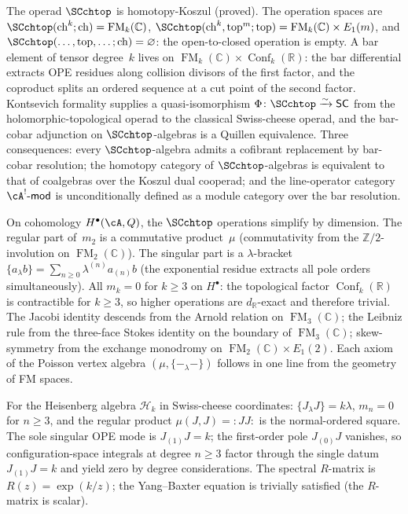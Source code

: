 The operad $\SCchtop$ is homotopy-Koszul (proved). The operation spaces
are $\SCchtop(\mathrm{ch}^k;\mathrm{ch})=\operatorname{FM}_k(\mathbb C)$,
$\SCchtop(\mathrm{ch}^k,\mathrm{top}^m;\mathrm{top})
=\operatorname{FM}_k(\mathbb C)\times E_1(m)$, and
$\SCchtop(\ldots,\mathrm{top},\ldots;\mathrm{ch})=\varnothing$:
the open-to-closed operation is empty. A bar element of tensor degree~$k$ lives on
$\operatorname{FM}_k(\mathbb C)\times\operatorname{Conf}_k(\mathbb R)$:
the bar differential extracts OPE residues along collision divisors of the
first factor, and the coproduct splits an ordered sequence at a cut point
of the second factor. Kontsevich formality supplies a
quasi-isomorphism $\Phi\colon\SCchtop\xrightarrow{\sim}\mathsf{SC}$ from
the holomorphic-topological operad to the classical Swiss-cheese operad,
and the bar-cobar adjunction on $\SCchtop$-algebras is a Quillen
equivalence. Three consequences: every $\SCchtop$-algebra admits a
cofibrant replacement by bar-cobar resolution; the homotopy category of
$\SCchtop$-algebras is equivalent to that of coalgebras over the Koszul
dual cooperad; and the line-operator category
$\cA^!\text{-}\mathsf{mod}$ is unconditionally defined as a module
category over the bar resolution.

On cohomology $H^\bullet(\cA,Q)$, the $\SCchtop$ operations simplify by
dimension. The regular part of~$m_2$ is a commutative product~$\mu$
(commutativity from the $\mathbb Z/2$-involution on
$\operatorname{FM}_2(\mathbb C)$). The singular part is a
$\lambda$-bracket $\{a_\lambda b\}=\sum_{n\ge 0}\lambda^{(n)}a_{(n)}b$
(the exponential residue extracts all pole orders simultaneously). All
$m_k=0$ for $k\ge 3$ on $H^\bullet$: the topological factor
$\operatorname{Conf}_k(\mathbb R)$ is contractible for $k\ge 3$, so
higher operations are $d_{\mathbb R}$-exact and therefore trivial. The
Jacobi identity descends from the Arnold relation on
$\operatorname{FM}_3(\mathbb C)$; the Leibniz rule from the three-face
Stokes identity on the boundary of
$\operatorname{FM}_3(\mathbb C)$; skew-symmetry from
the exchange monodromy on $\operatorname{FM}_2(\mathbb C)\times E_1(2)$.
Each axiom of the Poisson vertex algebra $(\mu,\{-_\lambda-\})$ follows
in one line from the geometry of FM spaces.

For the Heisenberg algebra $\mathcal H_k$ in Swiss-cheese coordinates:
$\{J_\lambda J\}=k\lambda$, $m_n=0$ for $n\ge 3$, and the regular
product $\mu(J,J)={:}JJ{:}$ is the normal-ordered square. The sole
singular OPE mode is $J_{(1)}J=k$; the first-order pole $J_{(0)}J$
vanishes, so configuration-space integrals at degree $n\ge 3$ factor
through the single datum $J_{(1)}J=k$ and yield zero by degree
considerations. The spectral $R$-matrix is $R(z)=\exp(k/z)$; the
Yang--Baxter equation is trivially satisfied (the $R$-matrix is
scalar).

